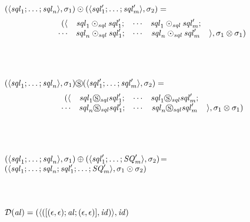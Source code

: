 \documentclass[numbers,10pt,preprint\ifanon ,nocopyrightspace\fi]{sigplanconf}
\begin{document}
\begin{definition}
  \\
  \\\ConcatDNFLens{} \OfType{}
  \ArrowTypeOf{\DNFLensType{}}{\ArrowTypeOf{\DNFLensType{}}{\DNFLensType{}}}\\
  $(\langle\mathit{sql}_1;\ldots;\mathit{sql}_n\rangle,\sigma_1)\odot(\langle\mathit{sql}_1';\ldots;\mathit{sql}_m'\rangle,\sigma_2)=$
  \[
    \begin{array}{rcccl}
      (\langle & \mathit{sql}_1\odot_{\mathit{sql}}\mathit{sql}_1'; & \cdots & \mathit{sql}_1\odot_{\mathit{sql}}\mathit{sql}_m'; \\
          \cdots    & \mathit{sql}_n\odot_{\mathit{sql}}\mathit{sql}_1'; & \cdots & \mathit{sql}_n\odot_{\mathit{sql}}\mathit{sql}_m' & \rangle,\sigma_1\otimes\sigma_1)
    \end{array}
  \]
  \\
  \\\SwapDNFLens{} \OfType{}
  \ArrowTypeOf{\DNFLensType{}}{\ArrowTypeOf{\DNFLensType{}}{\DNFLensType{}}}\\
  $(\langle\mathit{sql}_1;\ldots;\mathit{sql}_n\rangle,\sigma_1)\circledS(\langle\mathit{sql}_1';\ldots;\mathit{sql}_m'\rangle,\sigma_2)=$
  \[
    \begin{array}{rcccl}
      (\langle & \mathit{sql}_1\circledS_{\mathit{sql}}\mathit{sql}_1'; & \cdots & \mathit{sql}_1\circledS_{\mathit{sql}}\mathit{sql}_m'; \\
          \cdots    & \mathit{sql}_n\circledS_{\mathit{sql}}\mathit{sql}_1'; & \cdots & \mathit{sql}_n\circledS_{\mathit{sql}}\mathit{sql}_m' & \rangle,\sigma_1\otimes\sigma_1)
    \end{array}
  \]
  \\
  \\\OrDNFLens{} \OfType{}
  \ArrowTypeOf{\DNFLensType{}}{\ArrowTypeOf{\DNFLensType{}}{\DNFLensType{}}
  }\\
  $(\langle\mathit{sql}_1;\ldots;\mathit{sql}_n\rangle,\sigma_1)\oplus({\langle\mathit{sql}_1';\ldots;\mathit{SQ}_m'\rangle,\sigma_2)}$=\\
  \hspace*{2ex}$(\langle\mathit{sql}_1;\ldots;\mathit{sql}_n;
    \mathit{sql}_1';\ldots;\mathit{SQ}_m'\rangle,\sigma_1\odot\sigma_2)$\\
  \\
  \\\AtomToDNFLens{} \OfType{}
  \ArrowTypeOf{\AtomLensType{}}{\DNFLensType{}}\\
  $\mathcal{D}(\mathit{al}) = (\langle([(\epsilon,\epsilon);\mathit{al};(\epsilon,\epsilon)],\mathit{id})\rangle,\mathit{id})$
\end{definition}
\end{document}
